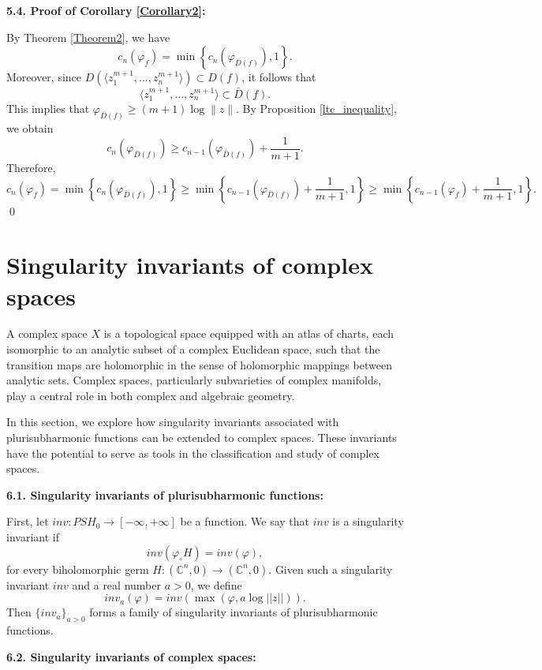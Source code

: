 \documentclass[a4paper,oneside,reqno,11pt]{article}
\begin{document}
{\bf 5.4. Proof of Corollary \ref{Corollary2}:}

By Theorem \ref{Theorem2}, we have
$$c_n(\varphi_f) = \min \left\{ c_n(\varphi_{\bar{D}(f)}), 1 \right\}.$$
Moreover, since \( D\left( \langle z_1^{m+1}, \dots, z_n^{m+1} \rangle \right) \subset D(f) \), it follows that
$$\langle z_1^{m+1}, \dots, z_n^{m+1} \rangle \subset \bar{D}(f).$$
This implies that $\varphi_{\bar{D}(f)} \geq (m+1) \log \|z\|$. By Proposition \ref{ltc_inequality}, we obtain
$$c_n(\varphi_{\bar{D}(f)}) \geq c_{n-1}(\varphi_{\bar{D}(f)}) + \frac{1}{m+1}.$$
Therefore,
$$c_n(\varphi_f) = \min \left\{ c_n(\varphi_{\bar{D}(f)}), 1 \right\} \geq \min \left\{ c_{n-1}(\varphi_{\bar{D}(f)}) + \frac{1}{m+1}, 1 \right\}\geq\min \left\{ c_{n-1}(\varphi_{ f } ) + \frac{1}{m+1}, 1 \right\}.$$
\qed

\section{Singularity invariants of complex spaces} 

A complex space $X$ is a topological space equipped with an atlas of charts, each isomorphic to an analytic subset of a complex Euclidean space, such that the transition maps are holomorphic in the sense of holomorphic mappings between analytic sets. Complex spaces, particularly subvarieties of complex manifolds, play a central role in both complex and algebraic geometry.

In this section, we explore how singularity invariants associated with plurisubharmonic functions can be extended to complex spaces. These invariants have the potential to serve as tools in the classification and study of complex spaces.

{\bf 6.1. Singularity invariants of plurisubharmonic functions:}

First, let $inv : PSH_{ 0 } \to [ -\infty, +\infty ]$ be a function. We say that $inv$ is a singularity invariant if 
$$inv ( \varphi_{\circ}  H ) = inv (\varphi ),$$ 
for every biholomorphic germ $H: ( \mathbb C^n, 0 ) \to ( \mathbb C^n, 0 )$. 
Given such a singularity invariant $inv$ and a real number $a>0$, we define
$$inv_a ( \varphi ) = inv ( \max (\varphi , a \log || z ||) ).$$
Then $\{ inv_a \}_{ a>0 }$ forms a family of singularity invariants of plurisubharmonic functions. 

{\bf 6.2. Singularity invariants of complex spaces:}
\end{document}
